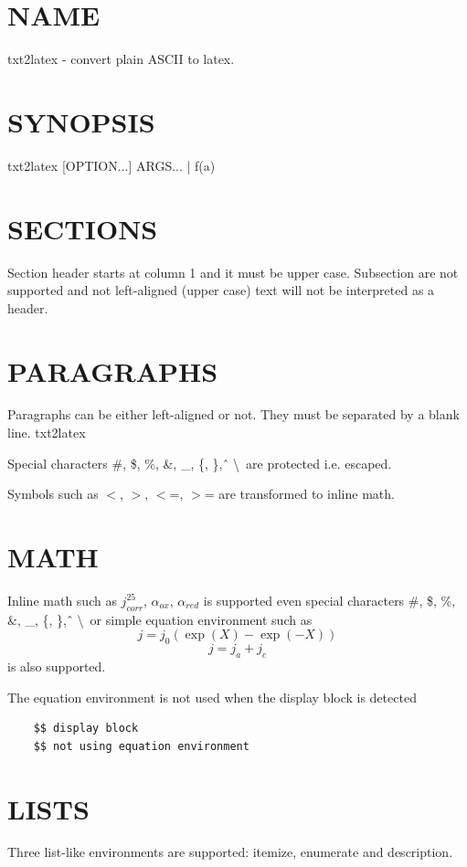 \section{NAME}
txt2latex - convert plain ASCII to latex.

\section{SYNOPSIS}
txt2latex [OPTION...] ARGS... | f(a)

\section{SECTIONS}
Section header starts at column 1 and it must be upper case.
Subsection are not supported and not left-aligned (upper case) text will not
be interpreted as a header.

\section{PARAGRAPHS}
Paragraphs can be either left-aligned or not. They must be separated
by a blank line. txt2latex

Special characters \#, \$, \%, \&, \_, \{, \}, \^\, \textbackslash\ are protected i.e. escaped.

Symbols such as $<$, $>$, $<$=, $>$= are transformed to inline math.

\section{MATH}
Inline math such as $ j_{corr}^{25} $, $\alpha _{ox}$, $\alpha_{red}$ is supported even special characters \#, \$, \%, \&, \_, \{, \}, \^\, \textbackslash\
or simple equation environment such as
$$ j=j_{0}\left(\exp(X)-\exp(-X)\right) $$
$$ j = j_a +j_c $$
is also supported.

The equation environment is not used when the display block is 
detected

\begin{verbatim}
    $$ display block
    $$ not using equation environment

\end{verbatim}
\section{LISTS}
Three list-like environments are supported: itemize, enumerate and description.

